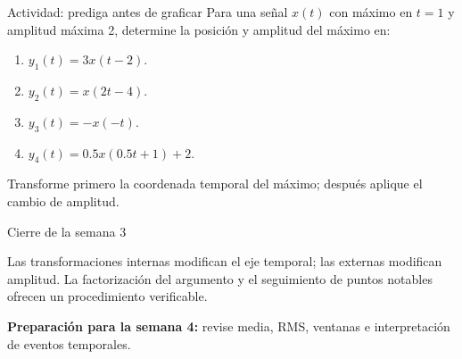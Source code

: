 \documentclass[
  ignorenonframetext,
  aspectratio=169,
  spanish,
  professionalfonts]{beamer}
\providecommand{\tightlist}{%
  \setlength{\itemsep}{0pt}\setlength{\parskip}{0pt}}
\begin{document}
\begin{frame}{Actividad: prediga antes de graficar}
\protect{}\label{actividad-prediga-antes-de-graficar}
Para una señal \(x(t)\) con máximo en \(t=1\) y amplitud máxima 2,
determine la posición y amplitud del máximo en:

\begin{enumerate}
\tightlist
\item
  \(y_1(t)=3x(t-2)\).
\item
  \(y_2(t)=x(2t-4)\).
\item
  \(y_3(t)=-x(-t)\).
\item
  \(y_4(t)=0.5x(0.5t+1)+2\).
\end{enumerate}

\begin{tcolorbox}[enhanced jigsaw, arc=.35mm, bottomrule=.15mm, bottomtitle=1mm, breakable, colback=white, colbacktitle=quarto-callout-tip-color!10!white, colframe=quarto-callout-tip-color-frame, coltitle=black, left=2mm, leftrule=.75mm, opacityback=0, opacitybacktitle=0.6, rightrule=.15mm, title={Secuencia recomendada}, titlerule=0mm, toprule=.15mm, toptitle=1mm]

Transforme primero la coordenada temporal del máximo; después aplique el
cambio de amplitud.

\end{tcolorbox}
\end{frame}

\begin{frame}{Cierre de la semana 3}
\protect{}\label{cierre-de-la-semana-3}
\begin{tcolorbox}[enhanced jigsaw, arc=.35mm, bottomrule=.15mm, bottomtitle=1mm, breakable, colback=white, colbacktitle=quarto-callout-important-color!10!white, colframe=quarto-callout-important-color-frame, coltitle=black, left=2mm, leftrule=.75mm, opacityback=0, opacitybacktitle=0.6, rightrule=.15mm, title={Síntesis}, titlerule=0mm, toprule=.15mm, toptitle=1mm]

Las transformaciones internas modifican el eje temporal; las externas
modifican amplitud. La factorización del argumento y el seguimiento de
puntos notables ofrecen un procedimiento verificable.

\end{tcolorbox}

\textbf{Preparación para la semana 4:} revise media, RMS, ventanas e
interpretación de eventos temporales.
\end{frame}
\end{document}
